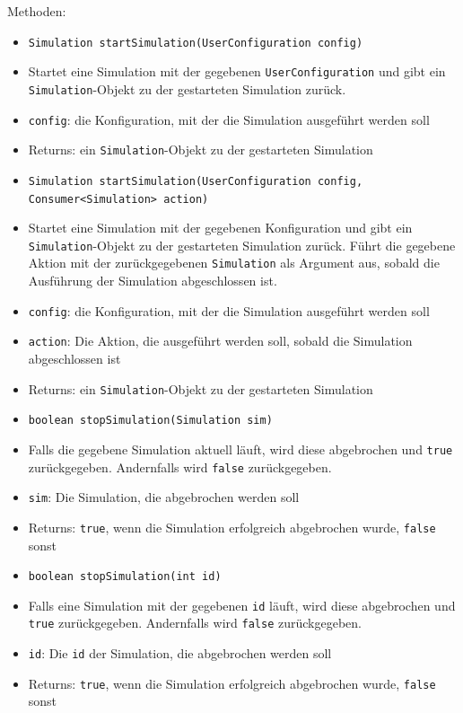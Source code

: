 \documentclass[parskip=full,11pt]{scrartcl}
\begin{document}
Methoden:
\begin{itemize} \itemsep -10pt
\item \texttt{Simulation startSimulation(UserConfiguration config)}
\item[] Startet eine Simulation mit der gegebenen \texttt{UserConfiguration} und gibt ein \texttt{Simulation}-Objekt zu der gestarteten Simulation zurück.
\item[]\texttt{config}: die Konfiguration, mit der die Simulation ausgeführt werden soll
\item[] Returns: ein \texttt{Simulation}-Objekt zu der gestarteten Simulation

\item \texttt{Simulation startSimulation(UserConfiguration config, Consumer<Simulation> action)}
\item[] Startet eine Simulation mit der gegebenen Konfiguration und gibt ein \texttt{Simulation}-Objekt zu der gestarteten Simulation zurück. Führt die gegebene Aktion mit der zurückgegebenen \texttt{Simulation} als Argument aus, sobald die Ausführung der Simulation abgeschlossen ist.
\item[] \texttt{config}: die Konfiguration, mit der die Simulation ausgeführt werden soll
\item[] \texttt{action}: Die Aktion, die ausgeführt werden soll, sobald die Simulation abgeschlossen ist
\item[] Returns: ein \texttt{Simulation}-Objekt zu der gestarteten Simulation

\item \texttt{boolean stopSimulation(Simulation sim)}
\item[] Falls die gegebene Simulation aktuell läuft, wird diese abgebrochen und \texttt{true} zurückgegeben. Andernfalls wird \texttt{false} zurückgegeben.
\item[] \texttt{sim}: Die Simulation, die abgebrochen werden soll
\item[] Returns: \texttt{true}, wenn die Simulation erfolgreich abgebrochen wurde, \texttt{false} sonst

\item \texttt{boolean stopSimulation(int id)}
\item[] Falls eine Simulation mit der gegebenen \texttt{id} läuft, wird diese abgebrochen und \texttt{true} zurückgegeben. Andernfalls wird \texttt{false} zurückgegeben.
\item[] \texttt{id}: Die \texttt{id} der Simulation, die abgebrochen werden soll
\item[] Returns: \texttt{true}, wenn die Simulation erfolgreich abgebrochen wurde, \texttt{false} sonst


\end{itemize}
\end{document}
